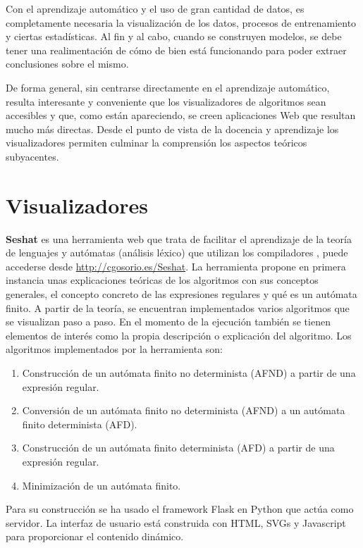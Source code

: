 
Con el aprendizaje automático y el uso de gran cantidad de datos, es
completamente necesaria la visualización de los datos, procesos de entrenamiento
y ciertas estadísticas. Al fin y al cabo, cuando se construyen modelos, se debe
tener una realimentación de cómo de bien está funcionando para poder extraer
conclusiones sobre el mismo.

De forma general, sin centrarse directamente en el aprendizaje automático,
resulta interesante y conveniente que los visualizadores de algoritmos sean
accesibles y que, como están apareciendo, se creen aplicaciones Web que resultan
mucho más directas. Desde el punto de vista de la docencia y aprendizaje los
visualizadores permiten culminar la comprensión los aspectos teóricos
subyacentes.

\section{Visualizadores}

\textbf{Seshat} es una herramienta web que trata de facilitar el aprendizaje de
la teoría de lenguajes y autómatas (análisis léxico) que utilizan los
compiladores \cite{arnaiz2018seshat} , puede accederse desde
\url{http://cgosorio.es/Seshat}. La herramienta propone en primera instancia
unas explicaciones teóricas de los algoritmos con sus conceptos generales, el
concepto concreto de las expresiones regulares y qué es un autómata finito. A
partir de la teoría, se encuentran implementados varios algoritmos que se
visualizan paso a paso. En el momento de la ejecución también se tienen
elementos de interés como la propia descripción o explicación del algoritmo. Los
algoritmos implementados por la herramienta son:
\begin{enumerate}
    \item Construcción de un autómata finito no determinista (AFND) a partir de una expresión regular.
    \item Conversión de un autómata finito no determinista (AFND) a un autómata finito determinista (AFD).
    \item Construcción de un autómata finito determinista (AFD) a partir de una expresión regular.
    \item Minimización de un autómata finito.
\end{enumerate}
Para su construcción se ha usado el framework Flask en Python que actúa como
servidor. La interfaz de usuario está construida con HTML, SVGs y Javascript
para proporcionar el contenido dinámico.


